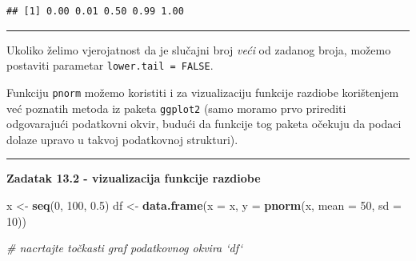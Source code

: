 \documentclass[]{book}
\newenvironment{Shaded}{\begin{snugshade}}{\end{snugshade}}
\newcommand{\KeywordTok}[1]{\textcolor[rgb]{0.13,0.29,0.53}{\textbf{#1}}}
\newcommand{\DataTypeTok}[1]{\textcolor[rgb]{0.13,0.29,0.53}{#1}}
\newcommand{\DecValTok}[1]{\textcolor[rgb]{0.00,0.00,0.81}{#1}}
\newcommand{\FloatTok}[1]{\textcolor[rgb]{0.00,0.00,0.81}{#1}}
\newcommand{\StringTok}[1]{\textcolor[rgb]{0.31,0.60,0.02}{#1}}
\newcommand{\CommentTok}[1]{\textcolor[rgb]{0.56,0.35,0.01}{\textit{#1}}}
\newcommand{\OperatorTok}[1]{\textcolor[rgb]{0.81,0.36,0.00}{\textbf{#1}}}
\newcommand{\NormalTok}[1]{#1}
\theoremstyle{definition}
\theoremstyle{definition}
\theoremstyle{definition}
\theoremstyle{remark}
\begin{document}
\begin{Shaded}
\end{Shaded}

\begin{verbatim}
## [1] 0.00 0.01 0.50 0.99 1.00
\end{verbatim}

\begin{center}\rule{0.5\linewidth}{\linethickness}\end{center}

Ukoliko želimo vjerojatnost da je slučajni broj \emph{veći} od zadanog
broja, možemo postaviti parametar \texttt{lower.tail\ =\ FALSE}.

Funkciju \texttt{pnorm} možemo koristiti i za vizualizaciju funkcije
razdiobe korištenjem već poznatih metoda iz paketa \texttt{ggplot2}
(samo moramo prvo prirediti odgovarajući podatkovni okvir, budući da
funkcije tog paketa očekuju da podaci dolaze upravo u takvoj podatkovnoj
strukturi).

\begin{center}\rule{0.5\linewidth}{\linethickness}\end{center}

\textbf{Zadatak 13.2 - vizualizacija funkcije razdiobe}

\begin{Shaded}
\begin{Highlighting}[]
\NormalTok{x <-}\StringTok{ }\KeywordTok{seq}\NormalTok{(}\DecValTok{0}\NormalTok{, }\DecValTok{100}\NormalTok{, }\FloatTok{0.5}\NormalTok{)}
\NormalTok{df <-}\StringTok{ }\KeywordTok{data.frame}\NormalTok{(}\DataTypeTok{x =}\NormalTok{ x, }\DataTypeTok{y =} \KeywordTok{pnorm}\NormalTok{(x, }\DataTypeTok{mean =} \DecValTok{50}\NormalTok{, }\DataTypeTok{sd =} \DecValTok{10}\NormalTok{))}

\CommentTok{# nacrtajte točkasti graf podatkovnog okvira `df`}
\end{Highlighting}
\end{Shaded}
\end{document}
